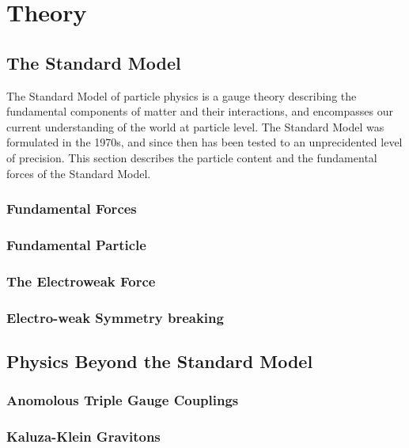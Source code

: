 \graphicspath{{Chapters/Theory/Figures/}}
\chapter{Theory}
\label{chap:Theory}

\section{The Standard Model}

The Standard Model of particle physics is a gauge theory describing the
fundamental components of matter and their interactions, and encompasses our
current understanding of the world at particle level. The Standard Model was
formulated in the 1970s, and since then has been tested to an unprecidented
level of precision. %
This section describes the particle content and the fundamental forces of the Standard Model.

\subsection{Fundamental Forces}

\subsection{Fundamental Particle}

\subsection{The Electroweak Force}

\subsection{Electro-weak Symmetry breaking}

\section{Physics Beyond the Standard Model}

\subsection{Anomolous Triple Gauge Couplings}

\subsection{Kaluza-Klein Gravitons}
